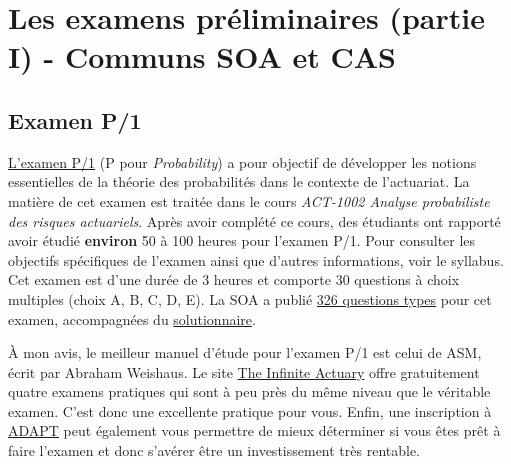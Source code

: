 \section*{Les examens préliminaires (partie I) - Communs SOA et CAS}
\label{sec:prelims}

\subsection*{Examen P/1}
\label{subsec:examp}
\href{https://www.soa.org/education/exam-req/edu-exam-p-detail.aspx}{L'examen P/1} (P pour \textit{Probability}) a pour objectif de développer les notions essentielles de la théorie des probabilités dans le contexte de l'actuariat. La matière de cet examen est traitée dans le cours \textit{ACT-1002 Analyse probabiliste des risques actuariels}. Après avoir complété ce cours, des étudiants ont rapporté avoir étudié \textbf{environ} 50 à 100 heures pour l'examen P/1. Pour consulter les objectifs spécifiques de l'examen ainsi que d'autres informations, voir le syllabus. Cet examen est d'une durée de 3 heures et comporte 30 questions à choix multiples (choix A, B, C, D, E). La SOA a publié \href{http://www.soa.org/Files/Edu/edu-exam-p-sample-quest.pdf}{326 questions types} pour cet examen, accompagnées du \href{http://www.soa.org/Files/Edu/edu-exam-p-sample-sol.pdf}{solutionnaire}.\vspace{\baselineskip}

À mon avis, le meilleur manuel d'étude pour l'examen P/1 est celui de ASM, écrit par Abraham Weishaus. Le site \href{http://www.theinfiniteactuary.com/exams/1}{The Infinite Actuary} offre gratuitement quatre examens pratiques qui sont à peu près du même niveau que le véritable examen. C'est donc une excellente pratique pour vous. Enfin, une inscription à \href{https://www.coachingactuaries.com/}{ADAPT} peut également vous permettre de mieux déterminer si vous êtes prêt à faire l'examen et donc s'avérer être un investissement très rentable.\vspace{\baselineskip}


